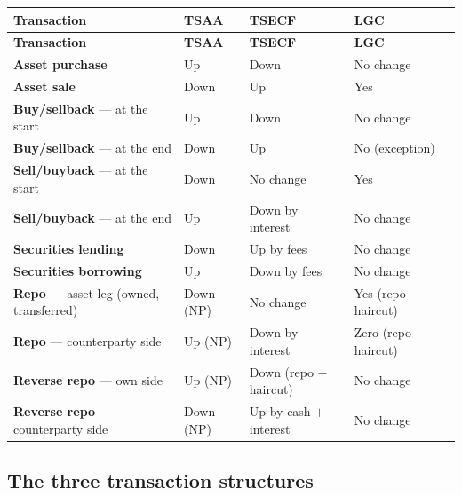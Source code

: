 \begin{center}
\scriptsize
\begin{longtable}{@{}p{3.5cm} p{2.3cm} p{2.9cm} p{5.2cm}@{}}
\toprule
\rowcolor{FRMSoft}\textbf{Transaction} & \textbf{TSAA} & \textbf{TSECF} & \textbf{LGC} \\
\midrule
\endfirsthead
\toprule
\rowcolor{FRMSoft}\textbf{Transaction} & \textbf{TSAA} & \textbf{TSECF} & \textbf{LGC} \\
\midrule
\endhead
\textbf{Asset purchase} & Up & Down & No change \\
\textbf{Asset sale} & Down & Up & Yes \\
\addlinespace
\textbf{Buy/sellback} --- at the start & Up & Down & No change \\
\textbf{Buy/sellback} --- at the end & Down & Up & No (exception) \\
\addlinespace
\textbf{Sell/buyback} --- at the start & Down & No change & Yes \\
\textbf{Sell/buyback} --- at the end & Up & Down by interest & No change \\
\addlinespace
\textbf{Securities lending} & Down & Up by fees & No change \\
\textbf{Securities borrowing} & Up & Down by fees & No change \\
\addlinespace
\textbf{Repo} --- asset leg (owned, transferred) & Down (NP) & No change & Yes (repo $-$ haircut) \\
\textbf{Repo} --- counterparty side & Up (NP) & Down by interest & Zero (repo $-$ haircut) \\
\addlinespace
\textbf{Reverse repo} --- own side & Up (NP) & Down (repo $-$ haircut) & No change \\
\textbf{Reverse repo} --- counterparty side & Down (NP) & Up by cash $+$ interest & No change \\
\bottomrule
\end{longtable}
\end{center}

\subsection{The three transaction structures}


